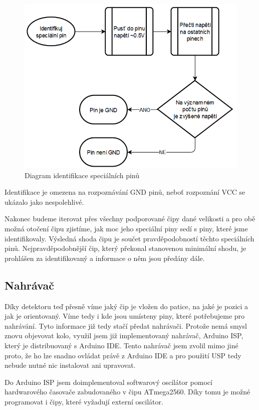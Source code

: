 \documentclass[11pt,a4paper,twoside,openright]{report}
\begin{document}
\begin{figure}[ht!]
  \includegraphics[width=0.7\linewidth]{img/identify_special_diagram.png}
  \centering
  \caption{Diagram identifikace speciálních pinů}
  \label{fig:detect_special}
\end{figure}

Identifikace je omezena na rozpoznávání GND pinů, neboť rozpoznání VCC se ukázalo jako nespolehlivé.

Nakonec budeme iterovat přes všechny podporované čipy dané velikosti a pro obě možná otočení čipu zjistíme, jak moc jeho speciální piny sedí s piny, které jsme identifikovaly. Výsledná shoda čipu je součet pravděpodobností těchto speciálních pinů. Nejpravděpodobnější čip, který překonal stanovenou minimální shodu, je prohlášen za identifikovaný a informace o něm jsou předány dále.

\subsection {Nahrávač \label{software:uploader}}

Díky detektoru teď přesně víme jaký čip je vložen do patice, na jaké je pozici a jak je orientovaný. Víme tedy i kde jsou umísteny piny, které potřebujeme pro nahrávání. Tyto informace již tedy stačí předat nahrávači. Protože nemá smysl znovu objevovat kolo, využil jsem již implementovaný nahrávač, Arduino ISP, který je distribuovaný s Arduino IDE. Tento nahrávač jsem zvolil mimo jiné proto, že ho lze snadno ovládat právě z Arduino IDE a pro použití USP tedy nebude nutné nic instalovat ani upravovat.

Do Arduino ISP jsem doimplementoval softwarový oscilátor pomocí hardwarového časovače zabudovaného v čipu ATmega2560.\cite{atmega2560} Díky tomu je možné programovat i čipy, které vyžadují externí oscilátor.
\end{document}
